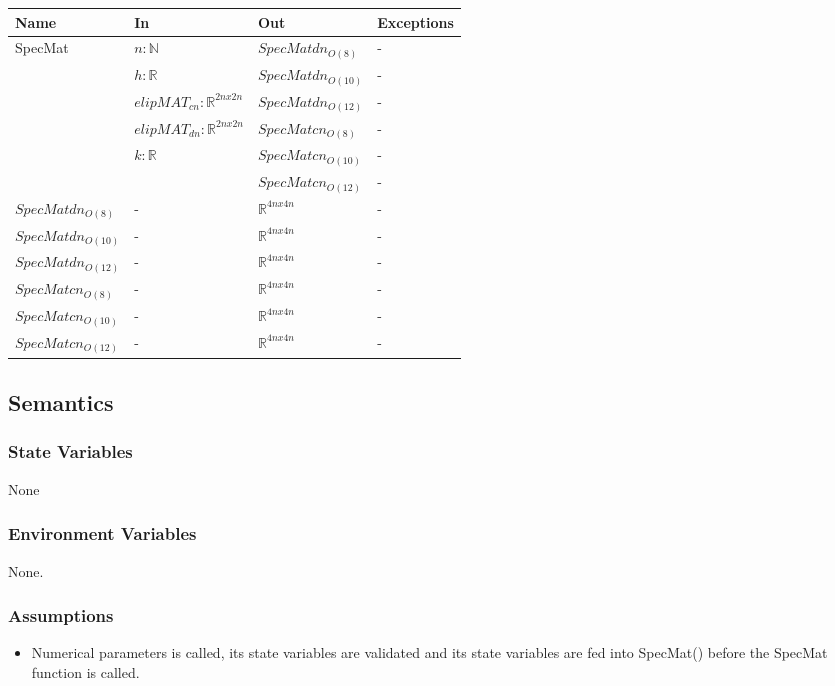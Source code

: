 \documentclass[12pt, titlepage]{article}
\begin{document}
\begin{center}
	\begin{tabular}{p{3cm} p{5cm} p{3cm} >{\raggedright\arraybackslash}p{5cm}}
		\toprule
		\textbf{Name} & \textbf{In} & \textbf{Out} & \textbf{Exceptions} \\
		\hline
		SpecMat & $n : \mathbb{N} $ &$SpecMatdn_{O(8)}$ & - \\ 
		 & $h : \mathbb{R} $& $SpecMatdn_{O(10)}$ & - \\ 
		 & $elipMAT_{cn} : \mathbb{R}^{2nx2n} $ &$SpecMatdn_{O(12)}$ & - \\ 
		 & $elipMAT_{dn} : \mathbb{R}^{2nx2n} $ &$SpecMatcn_{O(8)}$ & - \\ 
		 & $k : \mathbb{R} $ & $SpecMatcn_{O(10)}$& - \\
		 &  &  $SpecMatcn_{O(12)}$ &- \\
		$SpecMatdn_{O(8)}$ & - & $\mathbb{R}^{4nx4n}$ & - \\
		$SpecMatdn_{O(10)}$ & - & $\mathbb{R}^{4nx4n}$ & - \\ 
		$SpecMatdn_{O(12)}$ & - & $\mathbb{R}^{4nx4n}$ & - \\
		$SpecMatcn_{O(8)}$ & - & $\mathbb{R}^{4nx4n}$ & - \\
		$SpecMatcn_{O(10)}$ & - & $\mathbb{R}^{4nx4n}$ & - \\ 
		$SpecMatcn_{O(12)}$ & - & $\mathbb{R}^{4nx4n}$ & - \\
		\hline
	\end{tabular}
\end{center}

\subsection{Semantics}

\subsubsection{State Variables}
None

\subsubsection{Environment Variables}

None. 

\subsubsection{Assumptions}

\begin{itemize}
	\item Numerical parameters is called, its state variables are validated and 
	its state variables are fed into SpecMat() before the SpecMat function is 
	called. 
\end{itemize}
\end{document}
